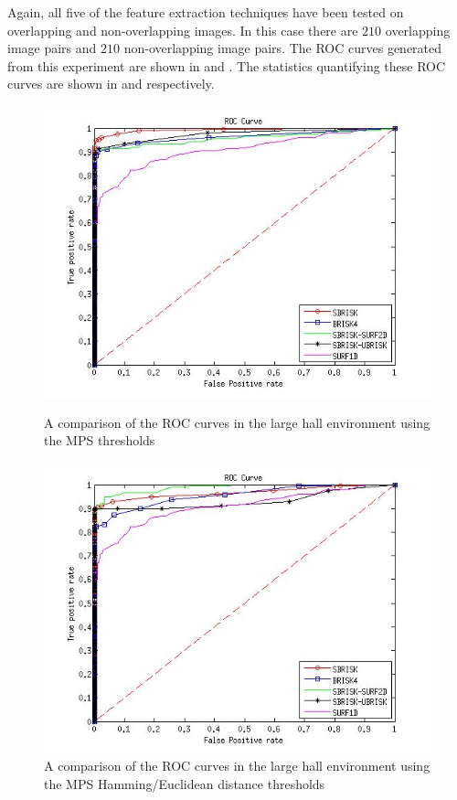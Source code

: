 \documentclass[11pt]{report}
\begin{document}
Again, all five of the feature extraction techniques have been tested on overlapping and non-overlapping images. In this case there are $210$ overlapping image pairs and $210$ non-overlapping image pairs. The ROC curves generated from this experiment are shown in  and . The statistics quantifying these ROC curves are shown in  and  respectively.\\

\begin{figure}[h!]
\begin{minipage}[b]{0.5\linewidth}
\includegraphics[scale=0.4]{../Drawings/dataset3_ROC_General_KNN.jpg}
\caption{A comparison of the ROC curves in the large hall environment using the MPS thresholds}
\label{fig:compareKnnOffice3}
\end{minipage}
\hspace{0.5cm}
\begin{minipage}[b]{0.5\linewidth}
\includegraphics[scale=0.4]{../Drawings/dataset3_ROC_General_Hamming.jpg}
\caption{A comparison of the ROC curves in the large hall environment using the MPS Hamming/Euclidean distance thresholds}
\label{fig:compareHammingOffice3}
\end{minipage}
\end{figure}
\end{document}
